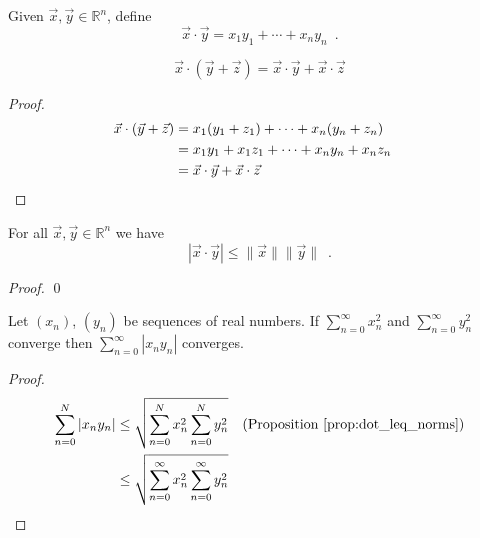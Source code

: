 \begin{df}
Given $\vec{x}, \vec{y} \in \mathbb{R}^n$, define
\[ \vec{x} \cdot \vec{y} = x_1 y_1 + \cdots + x_n y_n \enspace . \]
\end{df}

\begin{prop}
\[ \vec{x} \cdot (\vec{y} + \vec{z}) = \vec{x} \cdot \vec{y} + \vec{x} \cdot \vec{z} \]
\end{prop}

\begin{proof}
\pf
\begin{align*}
	\vec{x} \cdot (\vec{y} + \vec{z}) & = x_1 (y_1 + z_1) + \cdots + x_n (y_n + z_n) \\
	& = x_1 y_1 + x_1 z_1 + \cdots + x_n y_n + x_n z_n \\
	& = \vec{x} \cdot \vec{y} + \vec{x} \cdot \vec{z} & \qed
\end{align*}
\end{proof}

\begin{prop}
\label{prop:dot_leq_norms}
For all $\vec{x}, \vec{y} \in \mathbb{R}^n$ we have
\[ | \vec{x} \cdot \vec{y} | \leq \| \vec{x} \| \| \vec{y} \| \enspace . \]
\end{prop}

\begin{proof}
\pf
{}
\qed
\end{proof}

\begin{prop}
Let $(x_n)$, $(y_n)$ be sequences of real numbers. If $\sum_{n=0}^\infty x_n^2$ and $\sum_{n=0}^\infty y_n^2$ converge then $\sum_{n=0}^\infty |x_n y_n|$ converges.
\end{prop}

\begin{proof}
\pf
\begin{align*}
\sum_{n=0}^N |x_n y_n| & \leq \sqrt{\sum_{n=0}^N x_n^2 \sum_{n=0}^N y_n^2} & (\text{Proposition \ref{prop:dot_leq_norms}}) \\
& \leq \sqrt{\sum_{n=0}^\infty x_n^2 \sum_{n=0}^\infty y_n^2} & \qed
\end{align*}
\end{proof}


